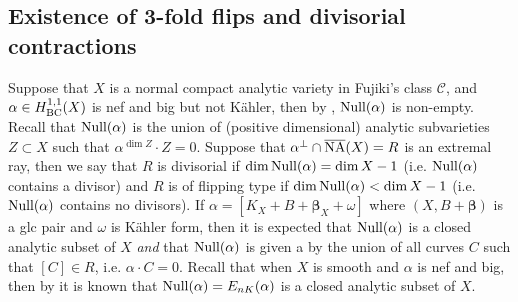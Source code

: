 \documentclass[12pt]{amsart}
\theoremstyle{plain}
\theoremstyle{remark}
\theoremstyle{definition}
\newcommand{\<}{\leq}
\def\mcC{\mathcal{C}}
\def\bbeta{\boldsymbol{\beta}}
\def\dim{\operatorname{dim}}
\theoremstyle{definition}
\theoremstyle{definition}
\numberwithin{equation}{section}
\theoremstyle{remark}
\begin{document}
\subsection{Existence of 3-fold flips and divisorial contractions}
Suppose that $X$ is a normal compact analytic variety in Fujiki's class $\mcC$, and $\alpha\in H^{1,1}_{\rm BC}(X)$ is nef and big but not K\"ahler, then by \cite[Theorem 2.30]{DHP22}, ${\rm Null}(\alpha)$ is non-empty. Recall that ${\rm Null}(\alpha)$ is the union of (positive dimensional) analytic subvarieties $Z\subset X$ such that $\alpha ^{\dim Z}\cdot Z=0$. Suppose that $\alpha ^\perp \cap \overline{\rm NA}(X)=R$ is an extremal ray, then we say that $R$ is divisorial if $\dim {\rm Null}(\alpha)=\dim X-1$ (i.e. ${\rm Null}(\alpha)$ contains a divisor) and $R$ is of flipping type if $\dim {\rm Null}(\alpha)<\dim X-1$ (i.e. ${\rm Null}(\alpha)$ contains no divisors). 
If $\alpha =[K_X+B+\bbeta _X+\omega]$ where $(X,B+\bbeta )$ is a glc pair and $\omega$ is K\"ahler form, then it is expected that ${\rm Null}(\alpha)$ is a closed analytic subset of $X$ {\it and} that ${\rm Null}(\alpha)$ is given a by the union of all curves $C$ such that $[C]\in R$, i.e. $\alpha\cdot C=0$. Recall that when $X$ is smooth and $\alpha $ is nef and big, then by \cite{CT15} it is known that ${\rm Null}(\alpha)= E_{nK}(\alpha)$ is a closed analytic subset of $X$. 
\end{document}
